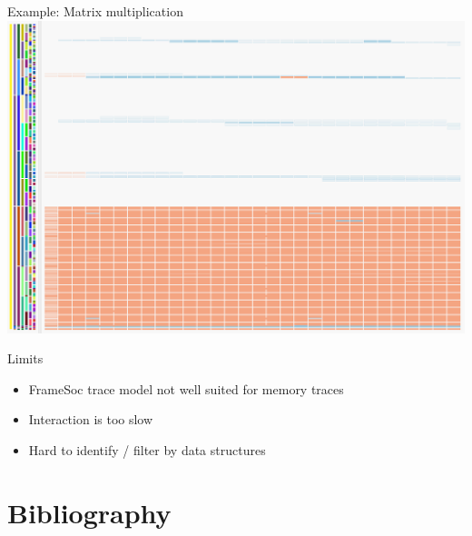 \documentclass[xcolor={usenames,dvipsnames},hyperref={pdfusetitle}]{beamer}
\begin{document}
\begin{frame}{Example: Matrix multiplication}
{{{{                }{
                    \includegraphics[width=\textwidth]{ocelotl/Sharing-zoom.png}
                }
            }
        }
    }
    \pause
    \pause
    \pause
    \pause
\end{frame}%

\setcounter{framenumber}{\value{finalframe}}
\begin{frame}{Limits}
    \begin{itemize}
        \item FrameSoc trace model not well suited for memory traces
        \item Interaction is too slow
        \item Hard to identify / filter by data structures
    \end{itemize}
\end{frame}



\section*{Bibliography}
%


\end{document}

